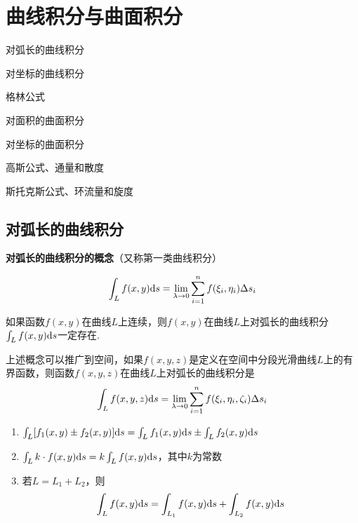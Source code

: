 \setcounter{chapter}{9}

\chapter{曲线积分与曲面积分}

\begin{introduction}
    \item 对弧长的曲线积分
    \item 对坐标的曲线积分
    \item 格林公式
    \item 对面积的曲面积分
    \item 对坐标的曲面积分
    \item 高斯公式、通量和散度
    \item 斯托克斯公式、环流量和旋度
\end{introduction}

\section{对弧长的曲线积分}

\textbf{对弧长的曲线积分的概念}（又称第一类曲线积分）

\begin{equation*}
    \int_{L}f(x,y)\mathrm{d} s=\lim_{\lambda\rightarrow 0}\sum_{i=1}^{n}f(\xi_i, \eta_i)\Delta s_{i}
\end{equation*}

如果函数$f(x,y)$在曲线$L$上连续，则$f(x,y)$在曲线$L$上对弧长的曲线积分$\int_{L}f(x,y)\mathrm{d} s$一定存在.

上述概念可以推广到空间，如果$f(x,y,z)$是定义在空间中分段光滑曲线$L$上的有界函数，则函数$f(x,y,z)$在曲线$L$上对弧长的曲线积分是
\begin{equation*}
    \int_{L}f(x,y,z)\mathrm{d} s=\lim_{\lambda\rightarrow 0}\sum_{i=1}^{n}f(\xi_i, \eta_i, \zeta_i)\Delta s_{i}
\end{equation*}

\begin{property}\label{property: line_integral}
    \begin{enumerate}
        \item $\int_{L}[f_1(x,y)\pm f_2(x,y)]\mathrm{d} s=\int_{L}f_1(x,y)\mathrm{d} s\pm\int_{L}f_2(x,y)\mathrm{d} s$
        \item $\int_{L}k\cdot f(x,y)\mathrm{d} s=k\int_{L}f(x,y)\mathrm{d} s$，其中$k$为常数
        \item 若$L=L_1+L_2$，则
        \begin{equation*}
            \int_{L}f(x,y)\mathrm{d} s=\int_{L_1}f(x,y)\mathrm{d} s+\int_{L_2}f(x,y)\mathrm{d} s
        \end{equation*}
    \end{enumerate}
\end{property}

